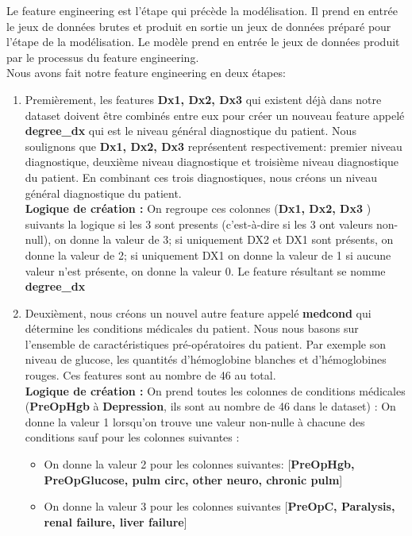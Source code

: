 \documentclass[12pt, french]{report}
\begin{document}
Le feature engineering est l'étape qui précède la modélisation. Il prend en entrée le jeux de données brutes et produit en sortie un jeux de données préparé pour l'étape de la modélisation. Le modèle prend en entrée le jeux de données produit par le processus du feature engineering. \\ 

Nous avons fait notre feature engineering en deux étapes: 
\begin{enumerate}
\item Premièrement, les features \textbf{Dx1, Dx2, Dx3 } qui existent déjà dans notre dataset doivent être combinés entre eux pour créer un nouveau feature appelé \textbf{degree\_dx} qui est le niveau général diagnostique du patient. Nous soulignons que  \textbf{Dx1, Dx2, Dx3} représentent respectivement: premier niveau diagnostique, deuxième niveau diagnostique et troisième niveau diagnostique du patient. En combinant ces trois diagnostiques, nous créons un niveau général  diagnostique du patient. \\
\textbf{Logique de création : } On regroupe ces colonnes (\textbf{Dx1, Dx2, Dx3 }) suivants la logique si les 3 sont presents (c'est-à-dire si les 3 ont valeurs non-null), on donne la valeur de 3; si uniquement DX2 et DX1 sont présents, on donne la valeur de 2; si uniquement DX1 on donne la valeur de 1 si aucune valeur n'est présente, on donne la valeur 0. Le feature résultant se nomme  \textbf{degree\_dx}
\item Deuxièment, nous créons un nouvel autre feature appelé \textbf{medcond} qui détermine les conditions médicales du patient. Nous nous basons sur l'ensemble de caractéristiques pré-opératoires du patient. Par exemple son niveau de glucose, les quantités d'hémoglobine blanches et d'hémoglobines rouges. Ces features sont au nombre de 46 au total.\\
\textbf{Logique de création : } On prend toutes les colonnes de conditions médicales (\textbf{PreOpHgb}  à \textbf{Depression}, ils sont au nombre de 46 dans le dataset) : On donne la valeur 1 lorsqu'on trouve une valeur non-nulle à chacune des conditions sauf pour les colonnes suivantes :
\begin{itemize}
\item On donne la valeur 2 pour les colonnes suivantes: [\textbf{PreOpHgb, PreOpGlucose, pulm circ, other neuro, chronic pulm}]
\item On donne la valeur 3 pour les colonnes suivantes [\textbf{PreOpC, Paralysis, renal failure, liver failure}]
\end{itemize}


\end{enumerate}
\end{document}

